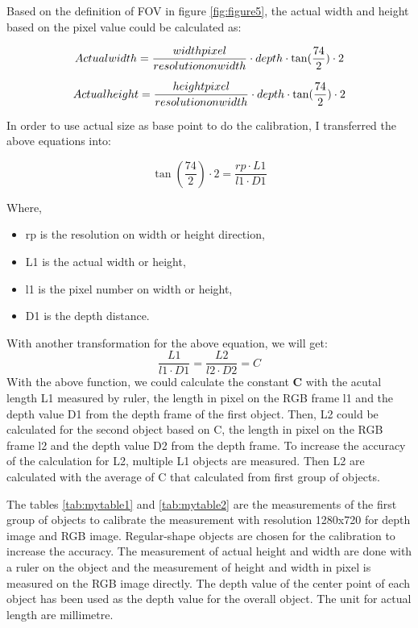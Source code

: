 \documentclass[
  oneside]{ubcthesis}
\providecommand{\tightlist}{%
  \setlength{\itemsep}{0pt}\setlength{\parskip}{0pt}}
\begin{document}
Based on the definition of FOV in figure \ref{fig:figure5}, the actual width and height based on the pixel value could be calculated as:

\[ Actual\space  width = \frac{width \space pixel}{resolution \space on \space width} \cdot depth \cdot \tan(\frac{74}{2}) \cdot 2 \]

\[ Actual \space height = \frac{height \space pixel}{resolution \space on \space width} \cdot depth \cdot \tan(\frac{74}{2}) \cdot 2 \]

In order to use actual size as base point to do the calibration, I transferred the above equations into:

\[ \tan(\frac{74}{2}) \cdot 2 = \frac{rp \cdot L1}{l1 \cdot D1} \]

Where,

\begin{itemize}
\tightlist
\item
  rp is the resolution on width or height direction,
\item
  L1 is the actual width or height,
\item
  l1 is the pixel number on width or height,
\item
  D1 is the depth distance.
\end{itemize}

With another transformation for the above equation, we will get:
\[\frac{L1}{l1 \cdot D1} = \frac{L2}{l2 \cdot D2} = C\]
With the above function, we could calculate the constant \textbf{C} with the acutal length L1 measured by ruler, the length in pixel on the RGB frame l1 and the depth value D1 from the depth frame of the first object. Then, L2 could be calculated for the second object based on C, the length in pixel on the RGB frame l2 and the depth value D2 from the depth frame. To increase the accuracy of the calculation for L2, multiple L1 objects are measured. Then L2 are calculated with the average of C that calculated from first group of objects.

The tables \ref{tab:mytable1} and \ref{tab:mytable2} are the measurements of the first group of objects to calibrate the measurement with resolution 1280x720 for depth image and RGB image. Regular-shape objects are chosen for the calibration to increase the accuracy. The measurement of actual height and width are done with a ruler on the object and the measurement of height and width in pixel is measured on the RGB image directly. The depth value of the center point of each object has been used as the depth value for the overall object. The unit for actual length are millimetre.
\end{document}

